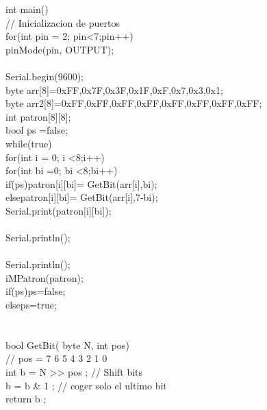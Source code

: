 \documentclass{article}
\begin{document}
int main(){\\

  // Inicializacion de puertos\\
  for(int pin = 2; pin<7;pin++){\\
  	 pinMode(pin, OUTPUT);\\
  }\\
  Serial.begin(9600);\\
  
  
  byte arr[8]={0xFF,0x7F,0x3F,0x1F,0xF,0x7,0x3,0x1};\\
  byte arr2[8]={0xFF,0xFF,0xFF,0xFF,0xFF,0xFF,0xFF,0xFF};\\
  int patron[8][8];\\
	bool ps =false;\\
    
  while(true){\\
    for(int i = 0; i <8;i++){\\
      for(int bi =0; bi <8;bi++){\\
        if(ps){patron[i][bi]= GetBit(arr[i],bi);}\\
        else{patron[i][bi]= GetBit(arr[i],7-bi);}\\
        Serial.print(patron[i][bi]);\\
      }\\
      Serial.println();\\
    }\\
    Serial.println();\\
    iMPatron(patron);\\

    if(ps){ps=false;}\\
    else{ps=true;}\\
  }\\
  }\\
bool GetBit( byte N, int pos)\\
   {                 // pos = 7 6 5 4 3 2 1 0\\
       int b = N >> pos ;         // Shift bits\\
       b = b & 1 ;                // coger solo el ultimo bit\\
       return b ;\\
   }\\
\end{document}
